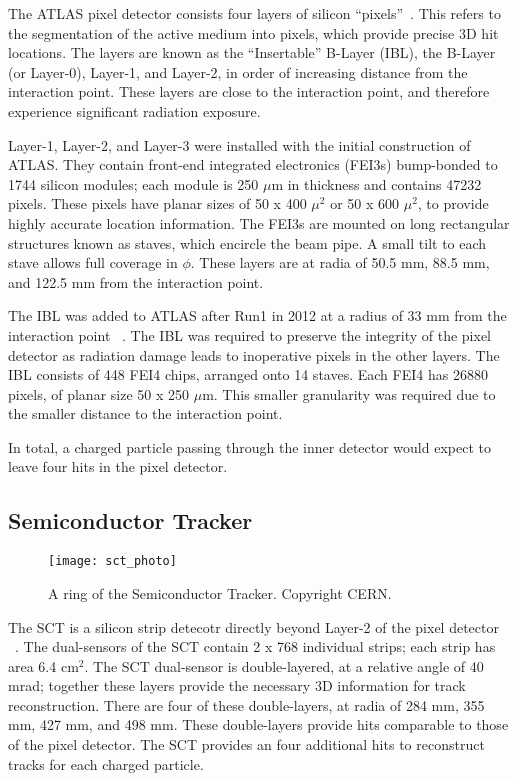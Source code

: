 The ATLAS pixel detector consists four layers of silicon ``pixels''~\cite{Aad:2008zz}.
This refers to the segmentation of the active medium into pixels, which provide precise 3D hit locations.
The layers are known as the ``Insertable'' B-Layer (IBL), the B-Layer (or Layer-0), Layer-1, and Layer-2, in order of increasing distance from the interaction point.
These layers are close to the interaction point, and therefore experience significant radiation exposure.

Layer-1, Layer-2, and Layer-3 were installed with the initial construction of ATLAS.
They contain front-end integrated electronics (FEI3s) bump-bonded to 1744 silicon modules; each module is 250 $\mu$m in thickness and contains 47232 pixels.
These pixels have planar sizes of 50 x 400 $\mu^2$ or  50 x 600 $\mu^2$, to provide highly accurate location information.
The FEI3s are mounted on long rectangular structures known as staves, which encircle the beam pipe.
A small tilt to each stave allows full coverage in $\phi$.
These layers are at radia of 50.5 mm, 88.5 mm, and 122.5 mm from the interaction point.

The IBL was added to ATLAS after Run1 in 2012 at a radius of 33 mm from the interaction point ~\cite{B-layerRef}.
The IBL was required to preserve the integrity of the pixel detector as radiation damage leads to inoperative pixels in the other layers.
The IBL consists of 448 FEI4 chips, arranged onto 14 staves.
Each FEI4 has 26880 pixels, of planar size 50 x 250 $\mu$m.
This smaller granularity was required due to the smaller distance to the interaction point.

In total, a charged particle passing through the inner detector would expect to leave four hits in the pixel detector.

\subsection{Semiconductor Tracker}
\begin{figure}
\caption{A ring of the Semiconductor Tracker. Copyright CERN.} \label{fig:sct_photo}
\texttt{[image: sct\_photo]}
\end{figure}

The SCT is a silicon strip detecotr directly beyond Layer-2 of the pixel detector ~\cite{IDET-2013-01}.
The dual-sensors of the SCT contain 2 x 768 individual strips; each strip has area 6.4 cm$^2$.
The SCT dual-sensor is double-layered, at a relative angle of 40 mrad; together these layers provide the necessary 3D information for track reconstruction.
There are four of these double-layers, at radia of 284 mm, 355 mm, 427 mm, and 498 mm.
These double-layers provide hits comparable to those of the pixel detector.
The SCT provides an four additional hits to reconstruct tracks for each charged particle.

